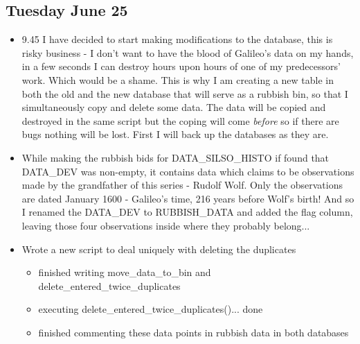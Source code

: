 \documentclass[12pt]{article}
\begin{document}
\subsection{Tuesday June 25}
\begin{itemize}
    \item 9.45 I have decided to start making modifications to the database, this is risky business - I don't want to have the blood of Galileo's data on my hands, in a few seconds I can destroy hours upon hours of one of my predecessors' work. Which would be a shame. This is why I am creating a new table in both the old and the new database that will serve as a rubbish bin, so that I simultaneously copy and delete some data. The data will be copied and destroyed in the same script but the coping will come \textit{before} so if there are bugs nothing will be lost. First I will back up the databases as they are.
    \item While making the rubbish bids for DATA\_SILSO\_HISTO if found that DATA\_DEV was non-empty, it contains data which claims to be observations made by the grandfather of this series - Rudolf Wolf. Only the observations are dated January 1600 - Galileo's time, 216 years before Wolf's birth! And so I renamed the DATA\_DEV to RUBBISH\_DATA and added the flag column, leaving those four observations inside where they probably belong...
    \item Wrote a new script to deal uniquely with deleting the duplicates
    \begin{itemize}
        \item finished writing move\_data\_to\_bin and delete\_entered\_twice\_duplicates
        \item executing delete\_entered\_twice\_duplicates()... done
        \item finished commenting these data points in rubbish data in both databases
    \end{itemize}
\end{itemize}
    
\end{document}
